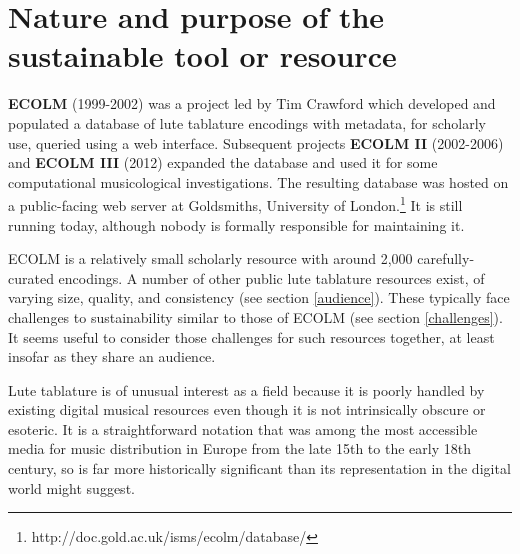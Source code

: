 \documentclass[sigconf, nonacm=true]{acmart}
\begin{document}
\maketitle
\begin{sloppypar}


  \section{Nature and purpose of the sustainable tool or resource}

  {\bf ECOLM} (1999-2002) was a project led by Tim Crawford which
  developed and populated a database of lute tablature encodings with
  metadata, for scholarly use, queried using a web
  interface. Subsequent projects {\bf ECOLM II} (2002-2006) and {\bf
    ECOLM III} (2012) expanded the database and used it for some
  computational musicological investigations. The resulting database
  was hosted on a public-facing web server at Goldsmiths, University
  of London.\footnote{http://doc.gold.ac.uk/isms/ecolm/database/} It
  is still running today, although nobody is formally responsible for
  maintaining it.

  ECOLM is a relatively small scholarly resource with around 2,000
  carefully-curated encodings. A number of other public lute tablature
  resources exist, of varying size, quality, and consistency (see
  section \ref{audience}). These typically face challenges to
  sustainability similar to those of ECOLM (see section
  \ref{challenges}). It seems useful to consider those challenges for
  such resources together, at least insofar as they share an
  audience.

  Lute tablature is of unusual interest as a field because it is
  poorly handled by existing digital musical resources even though it
  is not intrinsically obscure or esoteric. It is a straightforward
  notation that was among the most accessible media for music
  distribution in Europe from the late 15th to the early 18th century,
  so is far more historically significant than its representation in
  the digital world might suggest.
  

\end{sloppypar}
\end{document}

